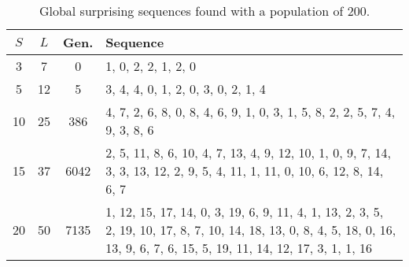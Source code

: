 \begin{table}
{\footnotesize
\begin{tabularx}{\textwidth}{cccX}
\toprule
$S$ & $L$ & Gen. & Sequence \\
\midrule
3 & 7 & 0 & 1, 0, 2, 2, 1, 2, 0 \\
5 & 12 & 5 & 3, 4, 4, 0, 1, 2, 0, 3, 0, 2, 1, 4 \\
10 & 25 & 386 & 4, 7, 2, 6, 8, 0, 8, 4, 6, 9, 1, 0, 3, 1, 5, 8, 2, 2, 5, 7, 4, 9, 3, 8, 6 \\
15 & 37 & 6042 & 2, 5, 11, 8, 6, 10, 4, 7, 13, 4, 9, 12, 10, 1, 0, 9, 7, 14, 3, 3, 13, 12, 2, 9, 5, 4, 11, 1, 11, 0, 10, 6, 12, 8, 14, 6, 7 \\
20 & 50 & 7135 & 1, 12, 15, 17, 14, 0, 3, 19, 6, 9, 11, 4, 1, 13, 2, 3, 5, 2, 19, 10, 17, 8, 7, 10, 14, 18, 13, 0, 8, 4, 5, 18, 0, 16, 13, 9, 6, 7, 6, 15, 5, 19, 11, 14, 12, 17, 3, 1, 1, 16 \\
\bottomrule
\end{tabularx}
}
\caption{Global surprising sequences found with a population of 200.}
\label{table:local_surprising}
\end{table}



